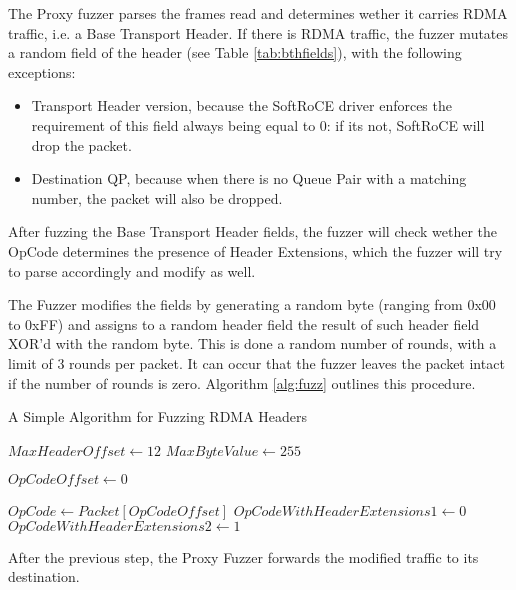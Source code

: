The Proxy fuzzer parses the frames read and determines wether it carries RDMA traffic, i.e. a Base Transport Header.
If there is RDMA traffic, the fuzzer mutates a random field of the header (see Table \ref{tab:bthfields}), with the following exceptions:

\begin{itemize}
  \item Transport Header version, because the SoftRoCE driver enforces the requirement of this field always being equal to 0: if its not, SoftRoCE will drop the packet.
  \item Destination QP, because when there is no Queue Pair with a matching number, the packet will also be dropped.
\end{itemize}

After fuzzing the Base Transport Header fields, the fuzzer will check wether the OpCode determines the presence of Header Extensions,
which the fuzzer will try to parse accordingly and modify as well.

The Fuzzer modifies the fields by generating a random byte (ranging from 0x00 to 0xFF) and
assigns to a random header field the result of such header field XOR'd with the random byte. This is done a random number
of rounds, with a limit of 3 rounds per packet. It can occur that the fuzzer leaves the packet intact if the number of rounds is zero.
Algorithm \ref{alg:fuzz} outlines this procedure.

\SetAlgoVlined
\begin{algorithm}[t]
  \caption{A Simple Algorithm for Fuzzing RDMA Headers}
  \label{alg:fuzz}
  \LinesNumberedHidden
  \DontPrintSemicolon
  $MaxHeaderOffset \gets 12$\;
  $MaxByteValue \gets 255$\;

  $OpCodeOffset \gets 0$\;

  $OpCode \gets Packet[OpCodeOffset]$\;
  $OpCodeWithHeaderExtensions1 \gets 0$\;
  $OpCodeWithHeaderExtensions2 \gets 1$\;

\end{algorithm}

After the previous step, the Proxy Fuzzer forwards the modified traffic to its destination.


